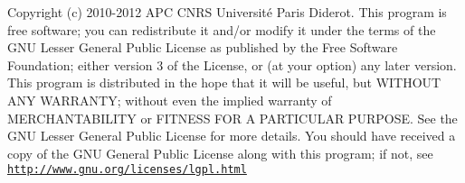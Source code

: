 Copyright (c) 2010-\/2012 A\-P\-C C\-N\-R\-S Université Paris Diderot. This program is free software; you can redistribute it and/or modify it under the terms of the G\-N\-U Lesser General Public License as published by the Free Software Foundation; either version 3 of the License, or (at your option) any later version. This program is distributed in the hope that it will be useful, but W\-I\-T\-H\-O\-U\-T A\-N\-Y W\-A\-R\-R\-A\-N\-T\-Y; without even the implied warranty of M\-E\-R\-C\-H\-A\-N\-T\-A\-B\-I\-L\-I\-T\-Y or F\-I\-T\-N\-E\-S\-S F\-O\-R A P\-A\-R\-T\-I\-C\-U\-L\-A\-R P\-U\-R\-P\-O\-S\-E. See the G\-N\-U Lesser General Public License for more details. You should have received a copy of the G\-N\-U General Public License along with this program; if not, see \href{http://www.gnu.org/licenses/lgpl.html}{\tt http\-://www.\-gnu.\-org/licenses/lgpl.\-html} 